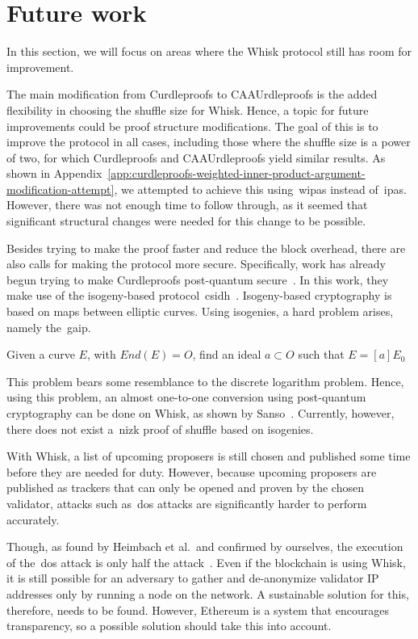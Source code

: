 \section{Future work}\label{sec:future-works}
In this section, we will focus on areas where the Whisk protocol still has room for improvement.

The main modification from Curdleproofs to CAAUrdleproofs is the added flexibility in choosing the shuffle size for Whisk.
Hence, a topic for future improvements could be proof structure modifications.
The goal of this is to improve the protocol in all cases, including those where the shuffle size is a power of two, for which Curdleproofs and CAAUrdleproofs yield similar results.
As shown in Appendix~\ref{app:curdleproofs-weighted-inner-product-argument-modification-attempt}, we attempted to achieve this using~\glspl{wipa} instead of~\glspl{ipa}.
However, there was not enough time to follow through, as it seemed that significant structural changes were needed for this change to be possible.


Besides trying to make the proof faster and reduce the block overhead, there are also calls for making the protocol more secure.
Specifically, work has already begun trying to make Curdleproofs post-quantum secure~\cite{pqwhisk}.
In this work, they make use of the isogeny-based protocol~\gls{csidh}~\cite{10.1007/978-3-030-03332-3_15}.
Isogeny-based cryptography is based on maps between elliptic curves.
Using isogenies, a hard problem arises, namely the~\gls{gaip}.
\begin{definition}
    Given a curve $E$, with $End(E)=O$, find an ideal $a\subset O$ such that $E=[a]E_0$
\end{definition}
This problem bears some resemblance to the discrete logarithm problem.
Hence, using this problem, an almost one-to-one conversion using post-quantum cryptography can be done on Whisk, as shown by Sanso~\cite{pqwhisk}.
Currently, however, there does not exist a~\gls{nizk} proof of shuffle based on isogenies.


With Whisk, a list of upcoming proposers is still chosen and published some time before they are needed for duty.
However, because upcoming proposers are published as trackers that can only be opened and proven by the chosen validator, attacks such as~\gls{dos} attacks are significantly harder to perform accurately.

Though, as found by Heimbach et al.~and confirmed by ourselves, the execution of the~\gls{dos} attack is only half the attack~\cite{heimbach2024deanonymizingethereumvalidatorsp2p,ouroldpaper}.
Even if the blockchain is using Whisk, it is still possible for an adversary to gather and de-anonymize validator IP addresses only by running a node on the network.
A sustainable solution for this, therefore, needs to be found.
However, Ethereum is a system that encourages transparency, so a possible solution should take this into account.
